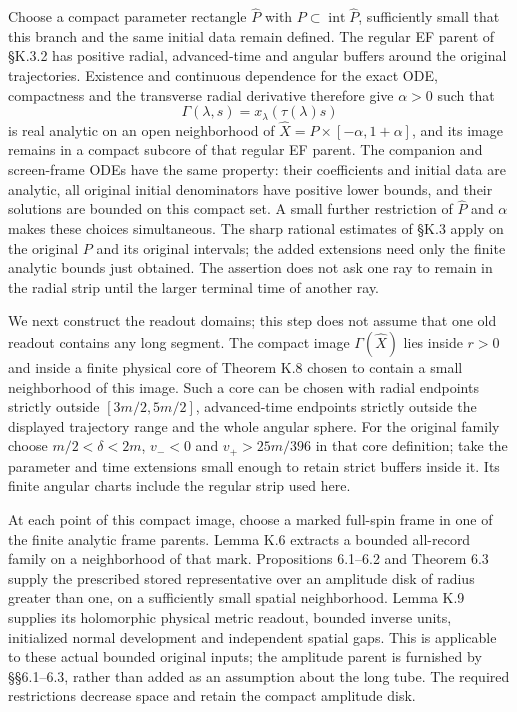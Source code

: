 \documentclass[
  english,
  11pt,
  reqno]{amsart}
\begin{document}
Choose a compact parameter rectangle \(\widehat P\) with
\(P\subset\operatorname{int}\widehat P\), sufficiently small that this
branch and the same initial data remain defined. The regular EF parent
of §K.3.2 has positive radial, advanced-time and angular buffers around
the original trajectories. Existence and continuous dependence for the
exact ODE, compactness and the transverse radial derivative therefore
give \(\alpha>0\) such that \[
 \Gamma(\lambda,s)=x_\lambda(\tau(\lambda)s)
\] is real analytic on an open neighborhood of
\(\widehat X=\widehat P\times[-\alpha,1+\alpha]\), and its image remains
in a compact subcore of that regular EF parent. The companion and
screen-frame ODEs have the same property: their coefficients and initial
data are analytic, all original initial denominators have positive lower
bounds, and their solutions are bounded on this compact set. A small
further restriction of \(\widehat P\) and \(\alpha\) makes these choices
simultaneous. The sharp rational estimates of §K.3 apply on the original
\(P\) and its original intervals; the added extensions need only the
finite analytic bounds just obtained. The assertion does not ask one ray
to remain in the radial strip until the larger terminal time of another
ray.

We next construct the readout domains; this step does not assume that
one old readout contains any long segment. The compact image
\(\Gamma(\widehat X)\) lies inside \(r>0\) and inside a finite physical
core of Theorem K.8 chosen to contain a small neighborhood of this
image. Such a core can be chosen with radial endpoints strictly outside
\([3m/2,5m/2]\), advanced-time endpoints strictly outside the displayed
trajectory range and the whole angular sphere. For the original family
choose \(m/2<\delta<2m\), \(v_-<0\) and \(v_+>25m/396\) in that core
definition; take the parameter and time extensions small enough to
retain strict buffers inside it. Its finite angular charts include the
regular strip used here.

At each point of this compact image, choose a marked full-spin frame in
one of the finite analytic frame parents. Lemma K.6 extracts a bounded
all-record family on a neighborhood of that mark. Propositions 6.1--6.2
and Theorem 6.3 supply the prescribed stored representative over an
amplitude disk of radius greater than one, on a sufficiently small
spatial neighborhood. Lemma K.9 supplies its holomorphic physical metric
readout, bounded inverse units, initialized normal development and
independent spatial gaps. This is applicable to these actual bounded
original inputs; the amplitude parent is furnished by §§6.1--6.3, rather
than added as an assumption about the long tube. The required
restrictions decrease space and retain the compact amplitude disk.
\end{document}
